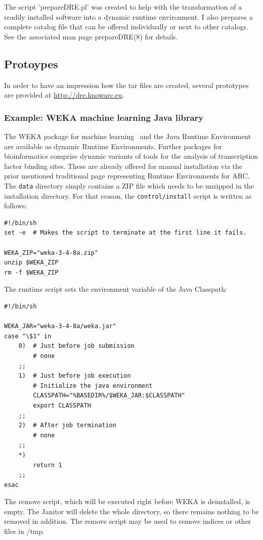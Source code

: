 The script 'prepareDRE.pl' was created to help with the transformation
of a readily installed software into a dynamic runtime environment.
I also prepares a complete catalog file that can be offered
individually or next to other catalogs. See the associated man page
prepareDRE(8) for details.

\subsection{Protoypes}

In order to have an impression how the tar files are created, several
prototypes are provided at \url{http://dre.knowarc.eu}.

\subsubsection{Example: WEKA machine learning Java library}

The WEKA package for machine learning~\cite{FRANK_20074} and the Java
Runtime Environment are available as dynamic Runtime Environments. Further
packages for bioinformatics comprise dynamic variants of tools for
the analysis of transcription factor binding sites. These are already
offered for manual installation via the prior mentioned traditional page
representing Runtime Environments for ARC.
The \texttt{data} directory simply contains
a ZIP file which needs to be unzipped in the installation directory. For
that reason, the \texttt{control/install} script is written as follows:

\begin{verbatim} 
#!/bin/sh
set -e  # Makes the script to terminate at the first line it fails.

WEKA_ZIP="weka-3-4-8a.zip"
unzip $WEKA_ZIP
rm -f $WEKA_ZIP
\end{verbatim}
The runtime script sets the environment variable of the Java Classpath:
\begin{verbatim}
#!/bin/sh

WEKA_JAR="weka-3-4-8a/weka.jar"
case "\$1" in
	0)	# Just before job submission
		# none
	;;
	1)	# Just before job execution
		# Initialize the java environment
		CLASSPATH="%BASEDIR%/$WEKA_JAR:$CLASSPATH"
		export CLASSPATH
	;;
	2)	# After job termination
		# none
	;;
	*)
		return 1
	;;
esac	
\end{verbatim}

The remove script, which will be executed right before WEKA is
deinstalled, is empty. The Janitor will delete the whole directory,
so there remains nothing to be removed in addition.
The remove script may \eg be used to remove indices or other files
in /tmp.

